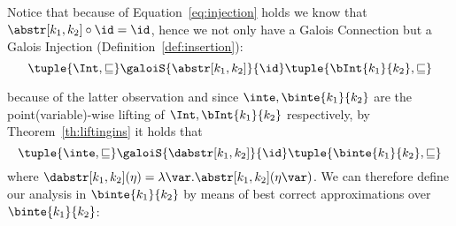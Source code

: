 Notice that because of Equation~\eqref{eq:injection} holds we know
that \(\abstr[k_1,k_2] \circ\id = \id\), hence we not only have a
Galois Connection but a Galois Injection
(Definition~\ref{def:insertion}):
\begin{equation}
  \tuple{\Int, \sqsubseteq} \galoiS{\abstr[k_1, k_2]}{\id} \tuple{\bInt{k_1}{k_2}, \sqsubseteq}
\end{equation}

because of the latter observation and since
\(\inte, \binte{k_1}{k_2}\) are the point(variable)-wise lifting of
\(\Int, \bInt{k_1}{k_2}\) respectively, by Theorem~\ref{th:liftingins}
it holds that
\begin{equation}\label{eq:inteinsert}
  \tuple{\inte, \sqsubseteq} \galoiS{\dabstr[k_1,k_2]}{\id} \tuple{\binte{k_1}{k_2}, \sqsubseteq}
\end{equation}
where
\({\dabstr[k_1,k_2]}(\eta) = \lambda \var
. \abstr[k_1,k_2](\eta\var)\).
We can therefore define our analysis in \(\binte{k_1}{k_2}\) by means
of best correct approximations over \(\binte{k_1}{k_2}\):

